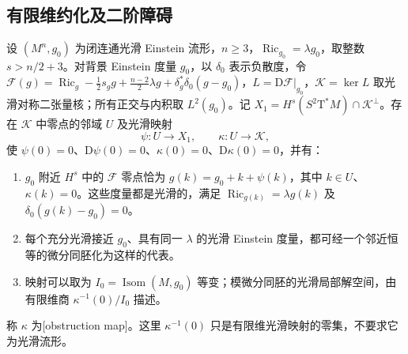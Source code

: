\subsection{有限维约化及二阶障碍}
\label{g3:subsec:2503:04}
\begin{theorem}\label{g3:thm:einstein-local-obstruction}
	设 \((M^n,g_0)\) 为闭连通光滑 Einstein 流形，\(n\ge3\)，\(\operatorname{Ric}_{g_0}=\lambda g_0\)，取整数 \(s>n/2+3\)。对背景 Einstein 度量 \(g_0\)，以 \(\delta_0\) 表示负散度，令 \(\mathcal F(g)=\operatorname{Ric}_g-\tfrac12s_gg+\tfrac{n-2}2\lambda g+\delta_g^*\delta_0(g-g_0)\)，\(L=\mathrm D\mathcal F|_{g_0}\)，\(\mathcal K=\ker L\) 取光滑对称二张量核；所有正交与内积取 \(L^2(g_0)\)。记 \(X_1=H^s(S^2\mathrm T^*M)\cap\mathcal K^\perp\)。存在 \(\mathcal K\) 中零点的邻域 \(U\) 及光滑映射
	\[
		\psi:U\to X_1,\qquad \kappa:U\to\mathcal K,
	\]
	使 \(\psi(0)=0\)、\(\mathrm D\psi(0)=0\)、\(\kappa(0)=0\)、\(\mathrm D\kappa(0)=0\)，并有：
	\begin{enumerate}
		\item \(g_0\) 附近 \(H^s\) 中的 \(\mathcal F\) 零点恰为 \(g(k)=g_0+k+\psi(k)\)，其中 \(k\in U\)、\(\kappa(k)=0\)。这些度量都是光滑的，满足 \(\operatorname{Ric}_{g(k)}=\lambda g(k)\) 及 \(\delta_0(g(k)-g_0)=0\)。
		\item 每个充分光滑接近 \(g_0\)、具有同一 \(\lambda\) 的光滑 Einstein 度量，都可经一个邻近恒等的微分同胚化为这样的代表。
		\item 映射可以取为 \(I_0=\operatorname{Isom}(M,g_0)\) 等变；模微分同胚的光滑局部解空间，由有限维商 \(\kappa^{-1}(0)/I_0\) 描述。
	\end{enumerate}
	称 \(\kappa\) 为[obstruction map]。这里 \(\kappa^{-1}(0)\) 只是有限维光滑映射的零集，不要求它为光滑流形。
\end{theorem}
